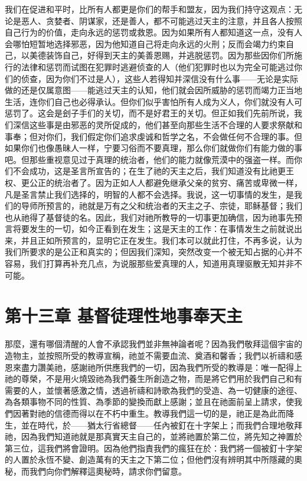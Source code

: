 我们在促进和平时，比所有人都更是你们的帮手和盟友，因为我们持守这观点：无论是恶人、贪婪者、阴谋家，还是善人，都不可能逃过天主的注意，并且各人按照自己行为的价值，走向永远的惩罚或救恩。因为如果所有人都知道这一点，没有人会哪怕短暂地选择邪恶，因为他知道自己将走向永远的火刑；反而会竭力约束自己，以美德装饰自己，好得到天主的美善恩赐，并逃脱惩罚。因为那些因你们所施行的法律和惩罚而试图在犯罪时逃避侦查的人（他们犯罪时也以为完全可能逃过你们的侦查，因为你们不过是人），这些人若得知并深信没有什么事——无论是实际做的还是仅属意图——能逃过天主的认知，他们就会因所威胁的惩罚而竭力正当地生活，连你们自己也必得承认。但你们似乎害怕所有人成为义人，你们就没有人可惩罚了。这会是刽子手们的关切，而不是好君王的关切。但正如我们先前所说，我们深信这些事是由邪恶的灵所促成的，他们甚至向那些生活不合理的人要求祭献和事奉；但对你们，我们假定你们追求虔诚和哲学之名，不会做任何不合理的事。但如果你们也像愚昧人一样，宁要习俗而不要真理，那么你们就做你们有能力做的事吧。但那些重视意见过于真理的统治者，他们的能力就像荒漠中的强盗一样。而你们不会成功，这是圣言所宣告的；在生了祂的天主之后，我们知道没有比祂更王权、更公正的统治者了。因为正如人人都避免继承父亲的贫穷、痛苦或卑微一样，凡是圣言禁止我们选择的，明智的人都不会选择。我说，这一切事情的发生，是我们的导师所预言的，祂就是万有之父和统治者的天主之子、宗徒，耶稣基督；我们也从祂得了基督徒的名。因此，我们对祂所教导的一切事更加确信，因为祂事先预言将要发生的一切，如今正看到在发生；这是天主的工作：在事情发生之前就说出来，并且正如所预言的，显明它正在发生。我们本可以就此打住，不再多说，认为我们所要求的是公正和真实的；但因我们深知，突然改变一个被无知占据的心并不容易，我们打算再补充几点，为说服那些爱真理的人，知道用真理驱散无知并非不可能。\par


\section{第十三章 基督徒理性地事奉天主}

那麼，還有哪個清醒的人會不承認我們並非無神論者呢？因為我們敬拜這個宇宙的造物主，並按照所受的教導宣稱，祂並不需要血流、奠酒和馨香；我們以祈禱和感恩來盡力讚美祂，感謝祂所供應我們的一切，因為我們所受的教導是：唯一配得上祂的尊榮，不是用火燒毀祂為我們養生所創造之物，而是將它們用於我們自己和有需要的人，並懷著感激之情，透過祈禱和詩歌為我們的受造、為一切健康的途徑、為各類事物不同的性質、為季節的變換而獻上感謝；並且在祂面前呈上請求，使我們因著對祂的信德而得以在不朽中重生。教導我們這一切的是，祂正是為此而降生，並在時代，於——猶太行省總督——任內被釘在十字架上；而我們合理地敬拜祂，因為我們知道祂就是那真實天主自己的，並將祂置於第二位，將先知之神置於第三位，這我們將會證明。因為他們指責我們的瘋狂在於：我們將一個被釘十字架的人置於永恆不變、創造萬有的天主之下第二位；但他們沒有辨明其中所隱藏的奧秘，而我們向你們解釋這奧秘時，請求你們留意。\par

